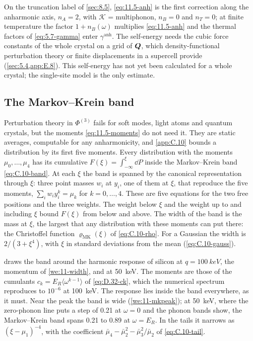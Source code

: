 On the truncation label of \cref{sec:8.5}, \cref{eq:11.5-anh} is the first correction along the anharmonic axis, $n_A = 2$, with $\mathcal{K}$ = multiphonon, $n_B = 0$ and $n_T = 0$; at finite temperature the factor $1 + n_B(\omega)$ multiplies \cref{eq:11.5-anh} and the thermal factors of \cref{eq:5.7-gamma} enter $\gamma^{\mathrm{anh}}$. The self-energy needs the cubic force constants of the whole crystal on a grid of $\bm{Q}$, which density-functional perturbation theory or finite displacements in a supercell provide (\cref{sec:5.4,app:E.8}). This self-energy has not yet been calculated for a whole crystal; the single-site model is the only estimate.

\subsection{The Markov--Krein band}

Perturbation theory in $\Phi^{(3)}$ fails for soft modes, light atoms and quantum crystals, but the moments \cref{eq:11.5-moments} do not need it. They are static averages, computable for any anharmonicity, and \cref{app:C.10} bounds a distribution by its first five moments. Every distribution with the moments $\mu_0, \dots, \mu_4$ has its cumulative $F(\xi) = \int_{-\infty}^{\xi}\dd P$ inside the Markov--Krein band \cref{eq:C.10-band}. At each $\xi$ the band is spanned by the canonical representation through $\xi$: three point masses $w_i$ at $y_i$, one of them at $\xi$, that reproduce the five moments, $\sum_iw_iy_i^k = \mu_k$ for $k = 0, \dots, 4$. These are five equations for the two free positions and the three weights. The weight below $\xi$ and the weight up to and including $\xi$ bound $F(\xi)$ from below and above. The width of the band is the mass at $\xi$, the largest that any distribution with these moments can put there: the Christoffel function $\varrho_{\mathrm{MK}}(\xi)$ of \cref{eq:C.10-rho}. For a Gaussian the width is $2/(3 + \xi^4)$, with $\xi$ in standard deviations from the mean (\cref{eq:C.10-gauss}).

 draws the band around the harmonic response of silicon at $q = \SI{100}{keV}$, the momentum of \cref{we:11-width}, and at \SI{50}{keV}. The moments are those of the cumulants $c_k = E_R\langle\omega^{k-1}\rangle$ of \cref{eq:D.32-ck}, which the numerical spectrum reproduces to $10^{-6}$ at \SI{100}{keV}. The response lies inside the band everywhere, as it must. Near the peak the band is wide (\cref{we:11-mkpeak}); at \SI{50}{keV}, where the zero-phonon line puts a step of 0.21 at $\omega = 0$ and the phonon bands show, the Markov--Krein band spans 0.21 to 0.89 at $\omega = E_R$. In the tails it narrows as $(\xi - \mu_1)^{-4}$, with the coefficient $\bar\mu_4 - \bar\mu_2^2 - \bar\mu_3^2/\bar\mu_2$ of \cref{eq:C.10-tail}.

